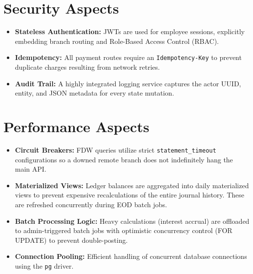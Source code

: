 \section{Security Aspects}
\begin{itemize}
    \item \textbf{Stateless Authentication:} JWTs are used for employee sessions, explicitly embedding branch routing and Role-Based Access Control (RBAC).
    \item \textbf{Idempotency:} All payment routes require an \texttt{Idempotency-Key} to prevent duplicate charges resulting from network retries.
    \item \textbf{Audit Trail:} A highly integrated logging service captures the actor UUID, entity, and JSON metadata for every state mutation.
\end{itemize}

\section{Performance Aspects}
\begin{itemize}
    \item \textbf{Circuit Breakers:} FDW queries utilize strict \texttt{statement\_timeout} configurations so a downed remote branch does not indefinitely hang the main API.
    \item \textbf{Materialized Views:} Ledger balances are aggregated into daily materialized views to prevent expensive recalculations of the entire journal history. These are refreshed concurrently during EOD batch jobs.
    \item \textbf{Batch Processing Logic:} Heavy calculations (interest accrual) are offloaded to admin-triggered batch jobs with optimistic concurrency control (FOR UPDATE) to prevent double-posting.
    \item \textbf{Connection Pooling:} Efficient handling of concurrent database connections using the \texttt{pg} driver.
\end{itemize}
